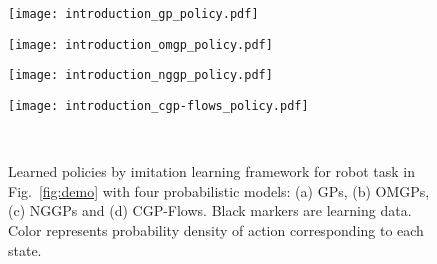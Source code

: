 \documentclass[sn-mathphys-num]{sn-jnl}
\begin{document}
\begin{figure}[t]
\centering
    \begin{minipage}[b]{0.4\hsize}
        \centering
        \texttt{[image: introduction\_gp\_policy.pdf]}
        \label{fig:four_policy:a}
    \end{minipage}
    \begin{minipage}[b]{0.4\hsize}
        \centering
        \texttt{[image: introduction\_omgp\_policy.pdf]}
        \label{fig:four_policy:b}
    \end{minipage}
    \begin{minipage}[b]{0.4\hsize}
        \centering
        \texttt{[image: introduction\_nggp\_policy.pdf]}
        \label{fig:four_policy:c}
    \end{minipage}
    \begin{minipage}[b]{0.4\hsize}
        \centering
        \texttt{[image: introduction\_cgp-flows\_policy.pdf]}
        \label{fig:four_policy:d}
    \end{minipage} \\
    \caption{Learned policies by imitation learning framework for robot task in Fig.~\ref{fig:demo} with four probabilistic models: (a) GPs, (b) OMGPs, (c) NGGPs and (d) CGP-Flows. Black markers are learning data. Color represents probability density of action corresponding to each state.}
    \label{fig:four_policy}
\end{figure}
\end{document}

